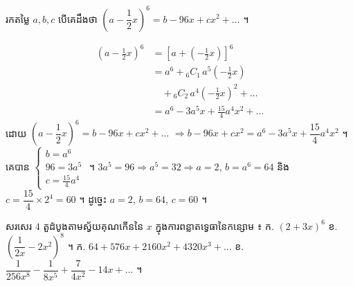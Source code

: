\begin{example}[លំហាត់គំរូ ៣]
រកតម្លៃ $a, b, c$ បើគេដឹងថា $\left(a - \dfrac{1}{2}x\right)^6 = b - 96x + cx^2 + \dots$ ។
\end{example}
\ans
\[ \begin{aligned}
\left(a - \frac{1}{2}x\right)^6 &= \left[a + \left(-\frac{1}{2}x\right)\right]^6\\
&= a^6 + {}_6C_1\, a^5\left(-\frac{1}{2}x\right)\\
&\quad + {}_6C_2\, a^4\left(-\frac{1}{2}x\right)^2 + \dots\\
&= a^6 - 3a^5x + \frac{15}{4}a^4x^2 + \dots
\end{aligned} \]
ដោយ $\left(a - \dfrac{1}{2}x\right)^6 = b - 96x + cx^2 + \dots$ $\Rightarrow b - 96x + cx^2 = a^6 - 3a^5x + \dfrac{15}{4}a^4x^2$ ។ គេបាន $\begin{cases} b = a^6\\ 96 = 3a^5\\ c = \frac{15}{4}a^4 \end{cases}$ ។ $3a^5 = 96 \Rightarrow a^5 = 32 \Rightarrow a = 2$, $b = a^6 = 64$ និង $c = \dfrac{15}{4}\times 2^4 = 60$ ។ ដូច្នេះ $a = 2$, $b = 64$, $c = 60$ ។

\begin{pro}
សរសេរ $4$ តួដំបូងតាមស្វ័យគុណកើននៃ $x$ ក្នុងការពន្លាតទ្វេធានៃកន្សោម ៖ \quad ក. $(2 + 3x)^6$ \quad ខ. $\left(\dfrac{1}{2x} - 2x^2\right)^8$ ។
\ans
ក. $64 + 576x + 2160x^2 + 4320x^3 + \dots$ \quad ខ. $\dfrac{1}{256x^8} - \dfrac{1}{8x^5} + \dfrac{7}{4x^2} - 14x + \dots$ ។
\end{pro}


